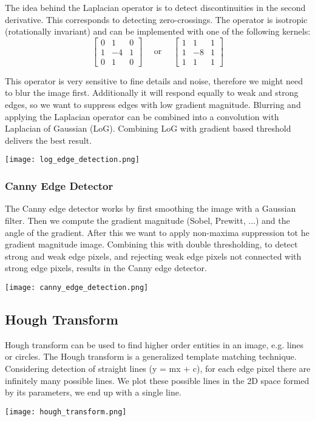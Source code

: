 The idea behind the Laplacian operator is to detect discontinuities in the second derivative. This corresponds to detecting zero-crossings. The operator is isotropic (rotationally invariant) and can be implemented with one of the following kernels:
$$
\begin{bmatrix}
    0 & 1 & 0\\
    1 & -4 & 1\\
    0 & 1 & 0
\end{bmatrix}
\quad
\text{ or }
\quad
\begin{bmatrix}
    1 & 1 & 1\\
    1 & -8 & 1\\
    1 & 1 & 1
\end{bmatrix}
$$

This operator is very sensitive to fine details and noise, therefore we might need to blur the image first. Additionally it will respond equally to weak and strong edges, so we want to suppress edges with low gradient magnitude. Blurring and applying the Laplacian operator can be combined into a convolution with Laplacian of Gaussian (LoG). Combining LoG with gradient based threshold delivers the best result.
\begin{center}
	\texttt{[image: log\_edge\_detection.png]}
\end{center}

\subsubsection{Canny Edge Detector}

The Canny edge detector works by first smoothing the image with a Gaussian filter. Then we compute the gradient magnitude (Sobel, Prewitt, ...) and the angle of the gradient. After this we want to apply non-maxima suppression tot he gradient magnitude image. Combining this with double thresholding, to detect strong and weak edge pixels, and rejecting weak edge pixels not connected with strong edge pixels, results in the Canny edge detector.
\begin{center}
	\texttt{[image: canny\_edge\_detection.png]}
\end{center}


\subsection{Hough Transform}

Hough transform can be used to find higher order entities in an image, e.g. lines or circles. The Hough transform is a generalized template matching technique. Considering detection of straight lines (y = mx + c), for each edge pixel there are infinitely many possible lines. We plot these possible lines in the 2D space formed by its parameters, we end up with a single line.
\begin{center}
	\texttt{[image: hough\_transform.png]}
\end{center}

